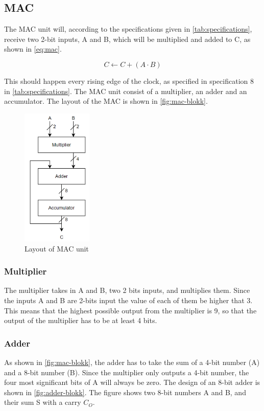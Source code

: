 \subsection{MAC}
\label{subsec:MAC_theory}

The MAC unit will, according to the specifications given in \autoref{tab:specifications}, receive two 2-bit inputs, A and B, which will be multiplied and added to C, as shown in \autoref{eq:mac}. 

\begin{equation}
    \label{eq:mac}
    C \leftarrow C + (A \cdot B)
\end{equation}

 This should happen every rising edge of the clock, as specified in specification 8 in \autoref{tab:specifications}. The MAC unit consist of a multiplier, an adder and an accumulator. The layout of the MAC is shown in \autoref{fig:mac-blokk}. 

\begin{figure}[htpb]
    \centering
    \includegraphics[width=0.3\textwidth]{Figures/mac-blokk.png}
    \caption{Layout of MAC unit}
    \label{fig:mac-blokk}
\end{figure}


\subsubsection{Multiplier}
The multiplier takes in A and B, two 2 bits inputs, and multiplies them. Since the inputs A and B are 2-bits input the value of each of them be higher that 3. This means that the highest possible output from the multiplier is 9, so that the output of the multiplier has to be at least 4 bits. 

\subsubsection{Adder}
As shown in \autoref{fig:mac-blokk}, the adder has to take the sum of a 4-bit number (A) and a 8-bit number (B). Since the multiplier only outputs a 4-bit number, the four most significant bits of A will always be zero. The design of an 8-bit adder is shown in \autoref{fig:adder-blokk}. The figure shows two 8-bit numbers A and B, and their sum S with a carry $C_O$. 

